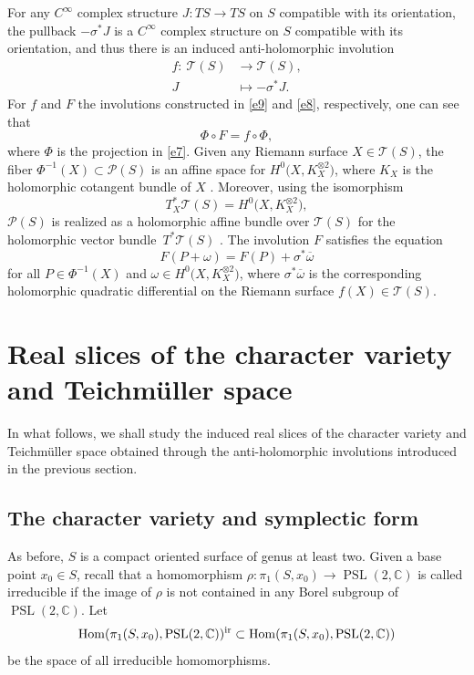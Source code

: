 \documentclass[pdftex]{sigma}
\numberwithin{equation}{section}
\begin{document}
For any $C^\infty$ complex structure $J\colon TS \longrightarrow TS$ on $S$ compatible with its orientation,
the pullback $-\sigma^*J$
is a $C^\infty$ complex structure on $S$ compatible with its orientation, and thus there is an induced anti-holomorphic involution
\begin{align}
f\colon\ {\mathcal T}(S) &\longrightarrow {\mathcal T}(S),\nonumber \\
J &\longmapsto -\sigma^*J. \label{e9}
\end{align}
For $f$ and $F$ the involutions constructed in \eqref{e9} and \eqref{e8}, respectively, one can see that
\begin{equation}\label{ec}
\Phi\circ F = f\circ\Phi,
\end{equation}
where $\Phi$ is the projection in \eqref{e7}. Given any Riemann surface $X \!\!\in\! {\mathcal T}(S)$, the fiber
${\Phi^{-1}(X)\! \subset \!{\mathcal P}(S)}$ is an affine space for
$H^0\bigl(X, K^{\otimes 2}_X\bigr)$, where $K_X$ is the holomorphic cotangent bundle
of $X$ \cite{ Gu, Hu}. Moreover, using the isomorphism
\[
T^*_X {\mathcal T}(S) = H^0\bigl(X, K^{\otimes 2}_X\bigr),
\]
${\mathcal P}(S)$ is realized as a holomorphic affine bundle over
${\mathcal T}(S)$ for the holomorphic vector bundle~$T^*{\mathcal T}(S)$ \cite{Gu,Hu}.
The involution $F$ satisfies the equation
\begin{equation}\label{fe}
F(P+\omega) = F(P)+ \sigma^*\overline{\omega}
\end{equation}
for all $P \in \Phi^{-1}(X)$ and $\omega \in H^0\bigl(X, K^{\otimes 2}_X\bigr)$, where
$\sigma^*\overline{\omega}$ is the corresponding holomorphic quadratic differential on the
Riemann surface $f(X) \in {\mathcal T}(S)$.

\section{Real slices of the character variety and Teichm\"uller space}

In what follows, we shall study the induced real slices of the character variety and Teichm\"uller space obtained through the
anti-holomorphic involutions introduced in the previous section.

\subsection{The character variety and symplectic form}

As before, $S$ is a compact oriented surface of genus at least two.
Given a base point $x_0 \in S$, recall that a homomorphism $\rho\colon \pi_1(S, x_0) \longrightarrow
\operatorname{PSL}(2,{\mathbb C})$ is called irreducible if the image of $\rho$ is not contained in any
Borel subgroup of $\operatorname{PSL}(2,{\mathbb C})$.
Let
\[
\operatorname{Hom}(\pi_1(S, x_0), \operatorname{PSL}(2,{\mathbb C}))^{\rm ir} \subset
\operatorname{Hom}(\pi_1(S, x_0), \operatorname{PSL}(2,{\mathbb C}))
\]
be the space of all irreducible homomorphisms.
\end{document}
